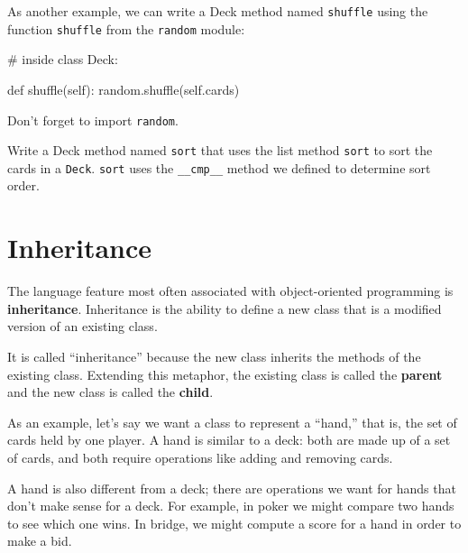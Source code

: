 As another example, we can write a Deck method named {\tt shuffle}
using the function {\tt shuffle} from the {\tt random} module:


\beforeverb
\begin{pycode}
# inside class Deck:
            
    def shuffle(self):
        random.shuffle(self.cards)
\end{pycode}
\afterverb
%
Don't forget to import {\tt random}.

\begin{exercise}

Write a Deck method named {\tt sort} that uses the list method
{\tt sort} to sort the cards in a {\tt Deck}.  {\tt sort} uses
the \verb"__cmp__" method we defined to determine sort order.
\end{exercise}



\section{Inheritance}


The language feature most often associated with object-oriented
programming is {\bf inheritance}.  Inheritance is the ability to
define a new class that is a modified version of an existing
class.


It is called ``inheritance'' because the new class inherits the
methods of the existing class.  Extending this metaphor, the existing
class is called the {\bf parent} and the new class is
called the {\bf child}.

As an example, let's say we want a class to represent a ``hand,''
that is, the set of cards held by one player.  A hand is similar to a
deck: both are made up of a set of cards, and both require operations
like adding and removing cards.

A hand is also different from a deck; there are operations we want for
hands that don't make sense for a deck.  For example, in poker we
might compare two hands to see which one wins.  In bridge, we might
compute a score for a hand in order to make a bid.


